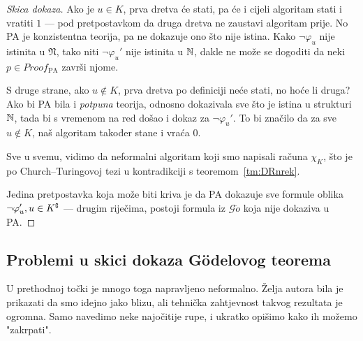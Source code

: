 \begin{proof}[Skica dokaza]
Ako je $u\in K$, prva dretva će stati, pa će i cijeli algoritam stati i vratiti $1$ --- pod pretpostavkom da druga dretva ne zaustavi algoritam prije. No PA je konzistentna teorija, pa ne dokazuje ono što nije istina. Kako $\neg\varphi_u$ nije istinita u $\mathfrak N$, tako niti $\neg\varphi_u'$ nije istinita u ${\mathbb N}$, dakle ne može se dogoditi da neki $p\in Proof_{\text{PA}}$ završi njome.

S druge strane, ako $u\notin K$, prva dretva po definiciji neće stati, no hoće li druga? Ako bi PA bila i \emph{potpuna} teorija, odnosno dokazivala sve što je istina u strukturi ${\mathbb N}$, tada bi s vremenom na red došao i dokaz za $\neg\varphi_u'$. To bi značilo da za sve $u\notin K$, naš algoritam također stane i vraća $0$.

Sve u svemu, vidimo da neformalni algoritam koji smo napisali računa $\chi_{K}$, što je po Church--\!Turingovoj tezi u kontradikciji s teoremom~\ref{tm:DRnrek}.

Jedina pretpostavka koja može biti kriva je da PA dokazuje sve formule oblika $\neg\varphi_u', u\in K\sp{{\scriptscriptstyle\complement}}$ --- drugim riječima, postoji formula iz $\mathscr G\ddot o$ koja nije dokaziva u PA\@.
\end{proof}

\subsection{Problemi u skici dokaza Gödelovog teorema}

U prethodnoj točki je mnogo toga napravljeno neformalno. Želja autora bila je prikazati da smo idejno jako blizu, ali tehnička zahtjevnost takvog rezultata je ogromna. Samo navedimo neke najočitije rupe, i ukratko opišimo kako ih možemo "zakrpati".

